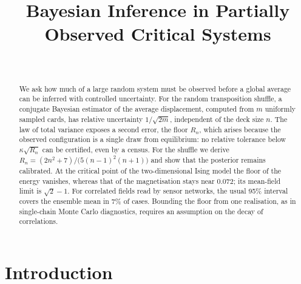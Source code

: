 \documentclass[ba,preprint]{imsart}
\theoremstyle{plain}
\theoremstyle{definition}
\begin{document}
\begin{frontmatter}
\title{Bayesian Inference in Partially Observed Critical Systems}

\begin{aug}
\author[A]{~}
\address[A]{Independent researcher, India}
\end{aug}

\begin{abstract}
We ask how much of a large random system must be observed before a global average can be inferred with controlled uncertainty. For the random transposition shuffle, a conjugate Bayesian estimator of the average displacement, computed from $m$ uniformly sampled cards, has relative uncertainty $1/\sqrt{2m}$, independent of the deck size $n$. The law of total variance exposes a second error, the floor $R_n$, which arises because the observed configuration is a single draw from equilibrium: no relative tolerance below $\kappa\sqrt{R_n}$ can be certified, even by a census. For the shuffle we derive $R_n=(2n^2+7)/\bigl(5(n-1)^2(n+1)\bigr)$ and show that the posterior remains calibrated. At the critical point of the two-dimensional Ising model the floor of the energy vanishes, whereas that of the magnetisation stays near $0.072$; its mean-field limit is $\sqrt{2}-1$. For correlated fields read by sensor networks, the usual 95\% interval covers the ensemble mean in 7\% of cases. Bounding the floor from one realisation, as in single-chain Monte Carlo diagnostics, requires an assumption on the decay of correlations.
\end{abstract}

\begin{keyword}[class=MSC]
\end{keyword}

\begin{keyword}
\end{keyword}

\end{frontmatter}

\section{Introduction}
\end{document}
